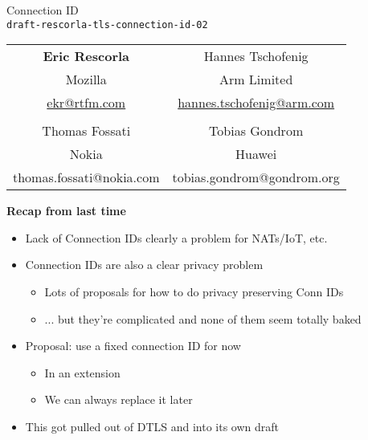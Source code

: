 \documentclass[helvetica]{seminar}
\newcommand{\heading}[1]{%
  \begin{center} 
    \large\bf 
    #1 
  \end{center} 
  \vspace{.4 in}}
\begin{document}
\begin{slide}
\begin{center}
\vspace{.5 in}
\LARGE{{\bf}Connection ID\\{\small \verb^draft-rescorla-tls-connection-id-02^}}\\
\vspace{.2in}
{\small
\begin{tabular}{c c}
\textbf{Eric Rescorla} & Hannes Tschofenig \\
Mozilla& Arm Limited \\ 
  \url{ekr@rtfm.com} & \url{hannes.tschofenig@arm.com} \\
  \\
  Thomas Fossati & Tobias Gondrom \\
  Nokia & Huawei \\
  thomas.fossati@nokia.com & tobias.gondrom@gondrom.org \\
  \end{tabular}

}

\end{center}
\end{slide}

\centerslidesfalse 

\begin{slide}
  \heading{Recap from last time}

  \begin{itemize}
  \item Lack of Connection IDs clearly a problem for NATs/IoT, etc.
  \item Connection IDs are also a clear privacy problem
    \begin{itemize}
    \item Lots of proposals for how to do privacy preserving Conn IDs
    \item ... but they're complicated and none of them seem totally baked
    \end{itemize}

  \item Proposal: use a fixed connection ID for now
    \begin{itemize}
    \item In an extension
    \item We can always replace it later
    \end{itemize}
    
  \item This got pulled out of DTLS and into its own draft
  \end{itemize}
\end{slide}
\end{document}
